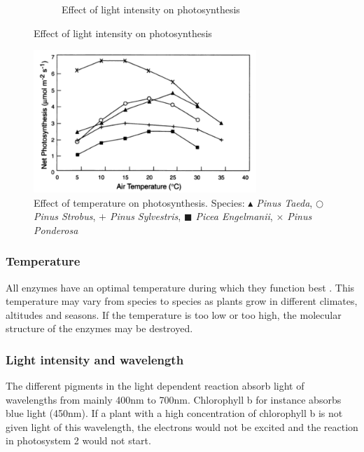 \begin{figure}
\begin{subfigure}[b]{0.45\textwidth}
                \caption{Effect of light intensity on photosynthesis}
                \label{fig:lightintensity}
        \end{subfigure}
       
\end{figure}

\begin{figure}
\centering
\includegraphics[width=0.75\textwidth]{img/photosynthesis/temperature_new.png}
\caption{Effect of temperature on photosynthesis. Species:
 \textit{\ensuremath{\blacktriangle} Pinus Taeda},  
\textit{\ensuremath{\bigcirc} Pinus Strobus}, 
\textit{\ensuremath{+} Pinus Sylvestris}, 
\textit{\ensuremath{\blacksquare} Picea Engelmanii}, 
\textit{\ensuremath{\times} Pinus Ponderosa}
\citep{hollinger1995external}
}
\label{fig:temperature}
\end{figure}

\subsubsection{Temperature}
All enzymes have an optimal temperature during which they function best \citep{bios}. This temperature may vary from species to species as plants grow in different climates, altitudes and seasons. If the temperature is too low or too high, the molecular structure of the enzymes may be destroyed.

\subsubsection{Light intensity and wavelength}
The different pigments in the light dependent reaction absorb light of wavelengths from mainly 400nm to 700nm. Chlorophyll b for instance absorbs blue light (450nm). If a plant with a high concentration of chlorophyll b is not given light of this wavelength, the electrons would not be excited and the reaction in photosystem 2 would not start.

